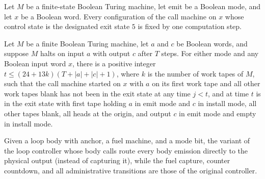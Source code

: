 \begin{lemma}
\label{Turing.FinTM.emCall_exit_fixed}
\leanok
{}
Let $M$ be a finite-state Boolean Turing machine, let $\mathrm{emit}$ be a Boolean mode,
and let $x$ be a Boolean word. Every configuration of the call machine on $x$ whose
control state is the designated exit state $5$ is fixed by one computation step.
\end{lemma}

\begin{lemma}
\label{Turing.FinTM.emCall_first}
\leanok
{}
Let $M$ be a finite Boolean Turing machine, let $a$ and $c$ be Boolean words, and
suppose $M$ halts on input $a$ with output $c$ after $T$ steps. For either mode and any
Boolean input word $x$, there is a positive integer $t\le (24+13k)(T+|a|+|c|+1)$, where
$k$ is the number of work tapes of $M$, such that the call machine started on $x$ with
$a$ on its first work tape and all other work tapes blank has not been in the exit state
at any time $j<t$, and at time $t$ is in the exit state with first tape holding $a$ in
emit mode and $c$ in install mode, all other tapes blank, all heads at the origin, and
output $c$ in emit mode and empty in install mode.
\end{lemma}

\begin{definition}
\label{Turing.FinTM.emLoopHost}
\leanok
{}
Given a loop body with anchor, a fuel machine, and a mode bit, the variant of the loop
controller whose body calls route every body emission directly to the physical output
(instead of capturing it), while the fuel capture, counter countdown, and all
administrative transitions are those of the original controller.
\end{definition}

